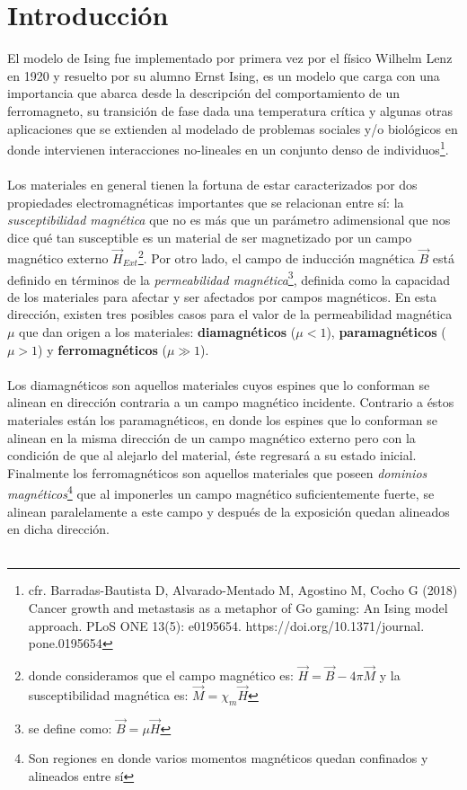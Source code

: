 \documentclass[11pt,a4paper]{article}
\begin{document}
\section{Introducción}

El modelo de Ising fue implementado por primera vez por el físico Wilhelm Lenz en 1920 y resuelto por su alumno Ernst Ising, es un modelo que carga con una importancia que abarca desde la descripción del comportamiento de un ferromagneto, su transición de fase dada una temperatura crítica y algunas otras aplicaciones que se extienden al modelado de problemas sociales y/o biológicos en donde intervienen interacciones no-lineales en un conjunto denso de individuos\footnote{cfr. Barradas-Bautista D, Alvarado-Mentado
M, Agostino M, Cocho G (2018) Cancer growth
and metastasis as a metaphor of Go gaming: An
Ising model approach. PLoS ONE 13(5):
e0195654. https://doi.org/10.1371/journal.
pone.0195654}.\\
\\
Los materiales en general tienen la fortuna de estar caracterizados por dos propiedades electromagnéticas importantes que se relacionan entre sí: la \textit{susceptibilidad magnética} que no es más que un parámetro adimensional que nos dice qué tan susceptible es un material de ser magnetizado por un campo magnético externo $\vec{H}_{Ext}$\footnote{donde consideramos que el campo magnético es: $\vec{H}=\vec{B}-4\pi\vec{M}$ y la susceptibilidad magnética es: $\vec{M}=\chi_m\vec{H}$}. Por otro lado, el campo de inducción magnética $\vec{B}$ está definido en términos de la \textit{permeabilidad magnética}\footnote{se define como: $\vec{B}=\mu\vec{H}$}, definida como la capacidad de los materiales para afectar y ser afectados por campos magnéticos. En esta dirección, existen tres posibles casos para el valor de la permeabilidad magnética $\mu$ que dan origen a los materiales: \textbf{diamagnéticos} ($\mu<1$), \textbf{paramagnéticos} ($\mu>1$) y \textbf{ferromagnéticos} ($\mu\gg1$).\\
\\
Los diamagnéticos son aquellos materiales cuyos espines que lo conforman se alinean en dirección contraria  a un campo magnético incidente. Contrario a éstos materiales están los paramagnéticos, en donde los espines que lo conforman se alinean en la misma dirección de un campo magnético externo pero con la condición de que al alejarlo del material, éste regresará a su estado inicial. Finalmente los ferromagnéticos son aquellos materiales que poseen \textit{dominios magnéticos}\footnote{Son regiones en donde varios momentos magnéticos quedan confinados y alineados entre sí} que al imponerles un campo magnético suficientemente fuerte, se alinean paralelamente a este campo y después de la exposición quedan alineados en dicha dirección.\\
\\
\end{document}
